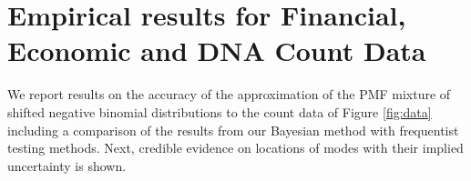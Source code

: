 \documentclass[11pt]{article}
\begin{document}


%




\section{Empirical results for Financial, Economic and DNA Count Data}
We report results on the accuracy of the approximation of the PMF mixture of shifted negative binomial distributions to the count data of Figure \ref{fig:data} including 
a comparison of the results from our Bayesian method with frequentist testing methods.
Next, credible evidence on locations of modes with their implied uncertainty is shown.

%
\end{document}
